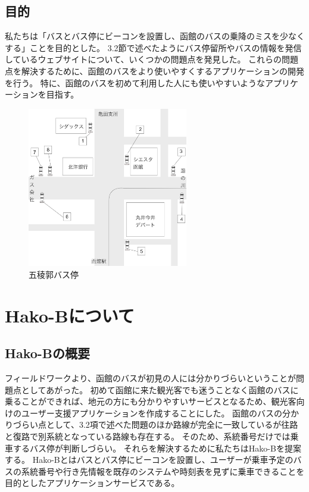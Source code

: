 \documentclass[openany,11pt,papersize]{jsbook}
\begin{document}

\section{目的}\label{sec:gaiyou}
私たちは「バスとバス停にビーコンを設置し、函館のバスの乗降のミスを少なくする」ことを目的とした。
3.2節で述べたようにバス停留所やバスの情報を発信しているウェブサイトについて、いくつかの問題点を発見した。
これらの問題点を解決するために、函館のバスをより使いやすくするアプリケーションの開発を行う。
特に、函館のバスを初めて利用した人にも使いやすいようなアプリケーションを目指す。


\begin{figure}[htbp]
  \begin{center}
    \includegraphics[clip,width=7.0cm]{img/14007.png}
    \caption{五稜郭バス停}
    \label{fig:goryo}
  \end{center}
\end{figure}

\chapter{Hako-Bについて}

\section{Hako-Bの概要}
フィールドワークより、函館のバスが初見の人には分かりづらいということが問題点としてあがった。
初めて函館に来た観光客でも迷うことなく函館のバスに乗ることができれば、地元の方にも分かりやすいサービスとなるため、観光客向けのユーザー支援アプリケーションを作成することにした。
函館のバスの分かりづらい点として、3.2項で述べた問題のほか路線が完全に一致しているが往路と復路で別系統となっている路線も存在する。
そのため、系統番号だけでは乗車するバス停が判断しづらい。
それらを解決するために私たちはHako-Bを提案する。
Hako-Bとはバスとバス停にビーコンを設置し、ユーザーが乗車予定のバスの系統番号や行き先情報を既存のシステムや時刻表を見ずに乗車できることを目的としたアプリケーションサービスである。
\end{document}
